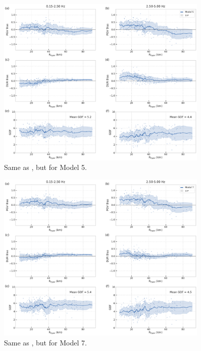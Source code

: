 \begin{figure}[!ht]
  \centering
  \includegraphics[width=0.9\textwidth,height=0.9\textheight,keepaspectratio]{figures/figure_highf_S15.pdf}
  \caption{Same as , but for Model 5.
  }
\label{fig:highf-S15}
\end{figure}
\clearpage


\begin{figure}[!ht]
  \centering
  \includegraphics[width=0.9\textwidth,height=0.9\textheight,keepaspectratio]{figures/figure_highf_S17.pdf}
  \caption{Same as , but for Model 7.
  }
\label{fig:highf-S17}
\end{figure}
\clearpage


